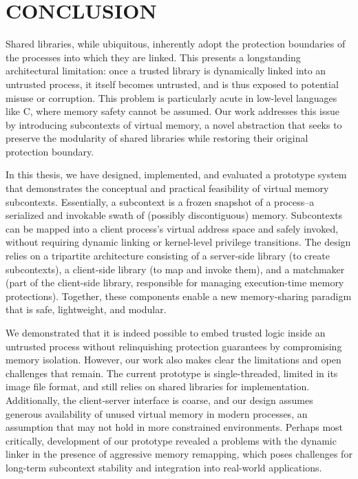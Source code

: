 \chapter*{CONCLUSION}
\thispagestyle{fancy}
Shared libraries, while ubiquitous, inherently adopt the protection boundaries of the processes into which they are linked. This presents a longstanding architectural limitation: once a trusted library is dynamically linked into an untrusted process, it itself becomes untrusted, and is thus exposed to potential misuse or corruption. This problem is particularly acute in low-level languages like C, where memory safety cannot be assumed. Our work addresses this issue by introducing subcontexts of virtual memory, a novel abstraction that seeks to preserve the modularity of shared libraries while restoring their original protection boundary.

In this thesis, we have designed, implemented, and evaluated a prototype system that demonstrates the conceptual and practical feasibility of virtual memory subcontexts. Essentially, a subcontext is a frozen snapshot of a process--a serialized and invokable swath of (possibly discontiguous) memory. Subcontexts can be mapped into a client process's virtual address space and safely invoked, without requiring dynamic linking or kernel-level privilege transitions. The design relies on a tripartite architecture consisting of a server-side library (to create subcontexts), a client-side library (to map and invoke them), and a matchmaker (part of the client-side library, responsible for managing execution-time memory protections). Together, these components enable a new memory-sharing paradigm that is safe, lightweight, and modular.

We demonstrated that it is indeed possible to embed trusted logic inside an untrusted process without relinquishing protection guarantees by compromising memory isolation. However, our work also makes clear the limitations and open challenges that remain. The current prototype is single-threaded, limited in its image file format, and still relies on shared libraries for implementation. Additionally, the client-server interface is coarse, and our design assumes generous availability of unused virtual memory in modern processes, an assumption that may not hold in more constrained environments. Perhaps most critically, development of our prototype revealed a problems with the dynamic linker in the presence of aggressive memory remapping, which poses challenges for long-term subcontext stability and integration into real-world applications.

